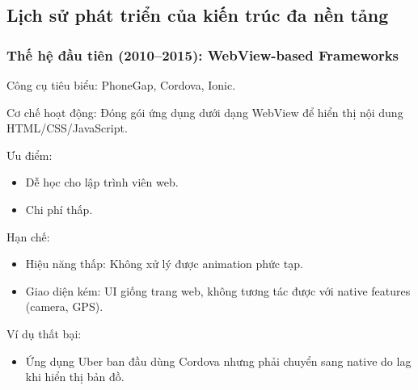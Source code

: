 \subsection{Lịch sử phát triển của kiến trúc đa nền tảng}
\renewcommand{\labelitemi}{--}    
    \begin{flushleft}
      \subsubsection{Thế hệ đầu tiên (2010–2015): WebView-based Frameworks}
        \begin{flushleft}
          \hspace*{0.8cm}Công cụ tiêu biểu: PhoneGap, Cordova, Ionic.
        \end{flushleft}

        \begin{flushleft}
          \hspace*{0.8cm}Cơ chế hoạt động: Đóng gói ứng dụng dưới dạng WebView để hiển thị nội dung HTML/CSS/JavaScript.
        \end{flushleft}

        \begin{flushleft}
          \hspace*{0.8cm}Ưu điểm:
          \setlength{\leftmargini}{1.5cm}
          \begin{itemize}
              \item Dễ học cho lập trình viên web.
              \item Chi phí thấp.
          \end{itemize}
        \end{flushleft}

        \begin{flushleft}
          \hspace*{0.8cm}Hạn chế:
          \setlength{\leftmargini}{1.5cm}
          \begin{itemize}
              \item Hiệu năng thấp: Không xử lý được animation phức tạp.
              \item Giao diện kém: UI giống trang web, không tương tác được với native features (camera, GPS).
          \end{itemize}
        \end{flushleft}

        \begin{flushleft}
          \hspace*{0.8cm}Ví dụ thất bại:
          \setlength{\leftmargini}{1.5cm}
          \begin{itemize}
              \item Ứng dụng Uber ban đầu dùng Cordova nhưng phải chuyển sang native do lag khi hiển thị bản đồ.
          \end{itemize}
        \end{flushleft}
      

\end{flushleft}
